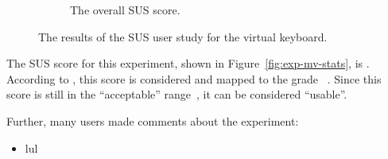 \begin{figure}[H]
\begin{subfigure}{.5\linewidth}
    \caption{The overall \ac{SUS} score.}\label{fig:score-exp-vk}
  \end{subfigure}%
  \caption[User study results of the virtual keyboard experiment]{The results of the \ac{SUS} user study for the virtual keyboard.}\label{fig:exp-vk-stats}
\end{figure}

The \ac{SUS} score for this experiment, shown in Figure~\ref{fig:exp-mv-stats}, is \evalExpVkSusScore{}.
According to \citeauthor{Bangor.2009}, this score is considered \evalExpVkSusAdj{} and mapped to the grade \evalExpVkSusGrade~\cite[120\psq]{Bangor.2009}. Since this score is still in the \enquote{acceptable} range~\cite[120\psq]{Bangor.2009}, it can be considered \enquote{usable}.

Further, many users made comments about the experiment:

\begin{itemize}
  \item lul
\end{itemize}


